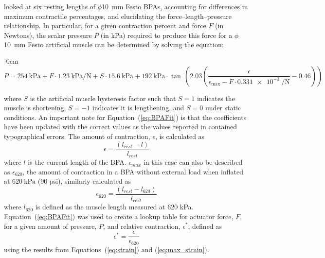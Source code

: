 \documentclass[actuators,article,accept,pdftex,moreauthors]{Definitions/mdpi}
\begin{document}
\citet{hunt_modeling_2017} looked at six resting lengths of $\phi$\qty{10}{\mm} Festo BPAs, accounting for differences in maximum contractile percentages, and elucidating the force--length--pressure relationship. In particular, for a given contraction percent and force $F$ (in Newtons), the scalar pressure $P$ (in kPa) required to produce this force for a $\phi$\qty{10}{\mm} Festo artificial muscle can be determined by solving the equation:
\begin{adjustwidth}{-\extralength}{0cm}
\begin{equation}
P = \qty{254}{\kPa} + F \cdot \qty{1.23}{\kPa\per\newton} + S \cdot \qty{15.6}{\kPa} + \qty{192}{\kPa} \cdot \tan\,\left( 2.03 \left( \frac{\epsilon}{\epsilon_{\max} - F \cdot \qty{0.331e-3}{\per\newton}} - 0.46 \right) \right)
\end{equation} \label{eq:BPAFit}
\end{adjustwidth}
where $S$ is the artificial muscle hysteresis factor such that $S=1$ indicates the muscle is shortening, $S=-1$ indicates it is lengthening, and $S=0$ under static conditions. An important note for Equation~(\ref{eq:BPAFit}) is that the coefficients have been updated with the correct values as the values reported in \cite{hunt_modeling_2017} contained typographical errors. The amount of contraction, ${\epsilon}$, is calculated as
\begin{equation}
    \epsilon = \frac{(l_{rest}-l)}{l_{rest}} \label{eq:strain}
\end{equation}
where {$l$ is the current length of the BPA. 
$\epsilon_{max}$ in this case can also be described as ${\epsilon_{620}}$,} %
the amount of contraction in a BPA without external load when inflated at $\qty{620}{\kPa}$ (90 psi), similarly calculated as 
\begin{equation}
    \epsilon_{620} = \frac{(l_{rest}-l_{620})}{l_{rest}} \label{eq:max_strain}
\end{equation}
where $l_{620}$ is defined as the muscle length measured at 620 kPa. 
Equation~(\ref{eq:BPAFit}) was used to create a lookup table for actuator force, $F$, for a given amount of pressure, $P$, and relative contraction, $\epsilon^*$, defined as
\begin{equation}
    \epsilon^* = \frac{\epsilon}{\epsilon_{620}} \label{eq:rel_strain}
\end{equation}
using the results from Equations~(\ref{eq:strain}) and (\ref{eq:max_strain}).
\end{document}
